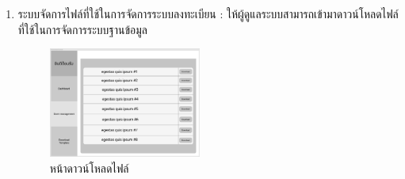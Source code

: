 \begin{enumerate}
  \item ระบบจัดการไฟล์ที่ใช้ในการจัดการระบบลงทะเบียน : ให้ผู้ดูแลระบบสามารถเข้ามาดาวน์โหลดไฟล์ที่ใช้ในการจัดการระบบฐานข้อมูล
  \begin{figure}[h]
  \begin{center}
  \includegraphics[width=50mm,scale=0.5]{photo/format.png}
  \end{center}
  \caption{หน้าดาวน์โหลดไฟล์}
  \label{fig:format-db}
  \end{figure}
\end{enumerate}